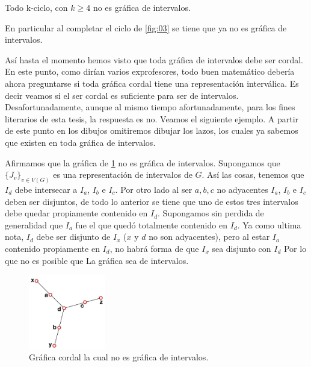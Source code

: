 \begin{corolario}
    Todo k-ciclo, con $k \geq 4$ no es gráfica de intervalos. 
\end{corolario}

En particular al completar el ciclo de \cref{fig:03} se tiene que ya no es gráfica de intervalos.

Así hasta el momento hemos visto que toda gráfica de intervalos debe ser cordal. En este punto, como dirían varios exprofesores, todo buen matemático debería ahora preguntarse si toda gráfica cordal tiene una representación interválica. Es decir veamos si el ser cordal es suficiente para ser de intervalos.
Desafortunadamente, aunque al mismo tiempo afortunadamente, para los fines literarios de esta tesis, la respuesta es no.
Veamos el siguiente ejemplo. A partir de este punto en los dibujos omitiremos dibujar los lazos, los cuales ya sabemos que existen en toda gráfica de intervalos.


Afirmamos que la gráfica de \cref{fig:GrafCrdlnodeInt} no es gráfica de intervalos. Supongamos que $ \{ J_v \}_{v\in V(G)}$ es una representación de intervalos de $G$. 
Así las cosas, tenemos que $I_d$ debe intersecar a $I_a$, $I_b$ e $I_c$. Por otro lado al ser $a,b,c$ no adyacentes $I_a$, $I_b$ e $I_c$ deben ser disjuntos, de todo lo anterior se tiene que uno de estos tres intervalos debe quedar propiamente contenido en $I_d$.
Supongamos sin perdida de generalidad que $I_a$ fue el que quedó totalmente contenido en $I_d$. 
Ya como ultima nota, $I_d$ debe ser disjunto de $I_x$  ($x$ y $d$ no son adyacentes), pero al estar $I_a$ contenido propiamente en $I_d$, no habrá forma de que $I_x$ sea disjunto con $I_d$ Por lo que no es posible que La gráfica sea de intervalos.

\begin{figure}[H]
  \centering
  \includegraphics[width=0.3\textwidth]{recursos/capturas/204.jpg}
  \caption{Gráfica cordal la cual no es gráfica de intervalos.}
  \label{fig:GrafCrdlnodeInt}
\end{figure}

